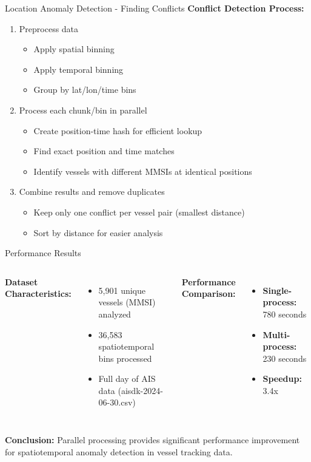 \documentclass[svgnames, 12pt]{beamer}
\begin{document}
\begin{frame}{Location Anomaly Detection - Finding Conflicts}
    \textbf{Conflict Detection Process:}
    \begin{enumerate}
        \item Preprocess data
        \begin{itemize}
            \item Apply spatial binning
            \item Apply temporal binning
            \item Group by lat/lon/time bins
        \end{itemize}
        \item Process each chunk/bin in parallel
        \begin{itemize}
            \item Create position-time hash for efficient lookup
            \item Find exact position and time matches
            \item Identify vessels with different MMSIs at identical positions
        \end{itemize}
        \item Combine results and remove duplicates
        \begin{itemize}
            \item Keep only one conflict per vessel pair (smallest distance)
            \item Sort by distance for easier analysis
        \end{itemize}
    \end{enumerate}
\end{frame}

\begin{frame}{Performance Results} 
    \begin{columns}[t]
      \textbf{Dataset Characteristics:} 
      \begin{itemize} 
        \item 5,901 unique vessels (MMSI) analyzed 
        \item 36,583 spatiotemporal bins processed 
        \item Full day of AIS data (aisdk-2024-06-30.csv) 
      \end{itemize} 
      
      \textbf{Performance Comparison:} 
      \begin{itemize} 
        \item \textbf{Single-process:} 780 seconds 
        \item \textbf{Multi-process:} 230 seconds 
        \item \textbf{Speedup:} 3.4x 
      \end{itemize} 
    \end{columns} 
    
    \vspace{0.5cm} 
    \textbf{Conclusion:} Parallel processing provides significant performance improvement for spatiotemporal anomaly detection in vessel tracking data. 
    \end{frame}
\end{document}
